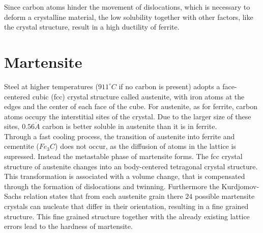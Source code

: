 Since carbon atoms hinder the movement of dislocations, which is necessary to deform a crystalline material, the low solubility together with other factors, like the crystal structure, result in a high ductility of ferrite. \\




\section{Martensite}

Steel at higher temperatures ($911^{\circ}C$ if no carbon is present) adopts a face-centered cubic (fcc) crystal structure called austenite, with iron atoms at the edges and the center of each face of the cube. For austenite, as for ferrite, carbon atoms occupy the interstitial sites of the crystal. Due to the larger size of these sites, $0.56\mathring{A}$ carbon is better soluble in austenite than it is in ferrite. \\

Through a fast cooling process, the transition of austenite into ferrite and cementite ($Fe_3C$) does not occur, as the diffusion of atoms in the lattice is supressed. Instead the metastable phase of martensite forms. The fcc crystal structure of austenite changes into an body-centered tetragonal crystal structure. This transformation is associated with a volume change, that is compensated through the formation of dislocations and twinning. Furthermore the Kurdjomov-Sachs relation states that from each austenite grain there $24$ possible martensite crystals can nucleate that differ in their orientation, resulting in a fine grained structure. This fine grained structure together with the already existing lattice errors lead to the hardness of martensite.

